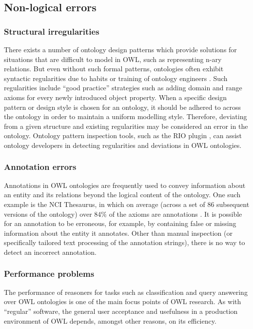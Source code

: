 \subsection{Non-logical errors}


\subsubsection{Structural irregularities}
There exists a number of ontology design patterns \cite{gangemi05cr,aranguren08nx} which provide  solutions for situations that are difficult to model in OWL, such as representing n-ary relations. But even without such formal patterns, ontologies often exhibit syntactic regularities due to habits or training of ontology engineers \cite{mikroyannidi12qf}. Such regularities include \enquote{good practice} strategies such as adding domain and range axioms for every newly introduced object property. When a specific design pattern or design style is chosen for an ontology, it should be adhered to across the ontology in order to maintain a uniform modelling style. Therefore, deviating from a given structure and existing regularities may be considered an error in the ontology. Ontology pattern inspection tools, such as the RIO \protege plugin \cite{mikroyannidi12aa}, can assist ontology developers in detecting regularities and deviations in OWL ontologies.


\subsubsection{Annotation errors}
Annotations in OWL ontologies are frequently used to convey information about an entity and its relations beyond the logical content of the ontology. One such example is the NCI Thesaurus, in which on average (across a set of 86 subsequent versions of the ontology) over 84\% of the axioms  are annotations \cite{goncalves11as}. It is possible for an annotation to be erroneous, for example, by containing false or missing information about the entity it annotates. Other than manual inspection (or specifically tailored text processing of the annotation strings), there is no way to detect an incorrect annotation.

\subsubsection{Performance problems}
The performance of reasoners for tasks such as classification and query answering over OWL ontologies is one of the main focus points of OWL research. As with \enquote{regular} software, the general user acceptance and usefulness in a production environment of OWL depends, amongst other reasons, on its efficiency.

